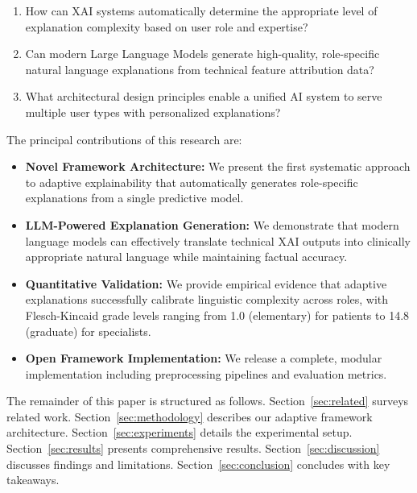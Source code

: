 \documentclass{ieeeaccess}
\begin{document}
\begin{enumerate}
\item How can XAI systems automatically determine the appropriate level of explanation complexity based on user role and expertise?
\item Can modern Large Language Models generate high-quality, role-specific natural language explanations from technical feature attribution data?
\item What architectural design principles enable a unified AI system to serve multiple user types with personalized explanations?
\end{enumerate}

The principal contributions of this research are:

\begin{itemize}
\item \textbf{Novel Framework Architecture:} We present the first systematic approach to adaptive explainability that automatically generates role-specific explanations from a single predictive model.

\item \textbf{LLM-Powered Explanation Generation:} We demonstrate that modern language models can effectively translate technical XAI outputs into clinically appropriate natural language while maintaining factual accuracy.

\item \textbf{Quantitative Validation:} We provide empirical evidence that adaptive explanations successfully calibrate linguistic complexity across roles, with Flesch-Kincaid grade levels ranging from 1.0 (elementary) for patients to 14.8 (graduate) for specialists.

\item \textbf{Open Framework Implementation:} We release a complete, modular implementation including preprocessing pipelines and evaluation metrics.
\end{itemize}

The remainder of this paper is structured as follows. Section~\ref{sec:related} surveys related work. Section~\ref{sec:methodology} describes our adaptive framework architecture. Section~\ref{sec:experiments} details the experimental setup. Section~\ref{sec:results} presents comprehensive results. Section~\ref{sec:discussion} discusses findings and limitations. Section~\ref{sec:conclusion} concludes with key takeaways.

\end{document}

